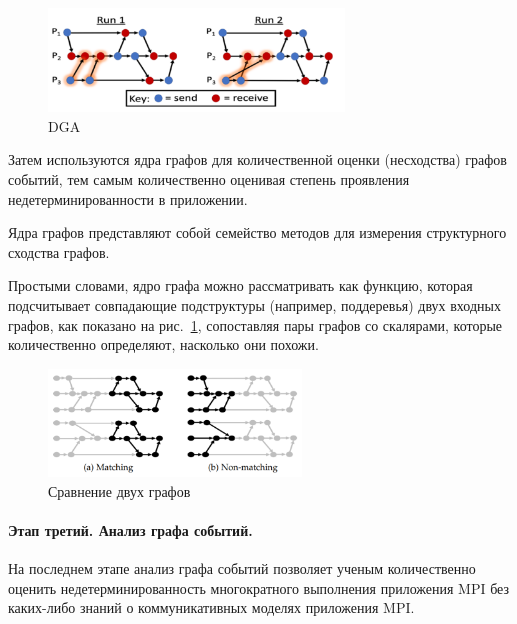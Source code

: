 \begin{figure}[h]
	\centering
	\includegraphics[width=0.7\textwidth]{ResearchNotes/rndhpc_not_edt_2021_11_10/krekhtunova/dga.png}
	\caption{DGA} 
\end{figure}

Затем используются ядра графов для количественной оценки (несходства) графов событий, тем самым количественно оценивая степень проявления недетерминированности в приложении.

Ядра графов представляют собой семейство методов для измерения структурного сходства графов. 

Простыми словами, ядро графа можно рассматривать как функцию, которая подсчитывает совпадающие подструктуры (например, поддеревья) двух входных графов, как показано на рис.~\ref{lab.rndhpc2021.11.10.010}, сопоставляя пары графов со скалярами, которые количественно определяют, насколько они похожи.

\begin{figure}[h]
	\centering
	\includegraphics[width=0.6\textwidth]{ResearchNotes/rndhpc_not_edt_2021_11_10/krekhtunova/graph_comp.png}
	\caption{Сравнение двух графов}\label{lab.rndhpc2021.11.10.010}
\end{figure}

\paragraph{Этап третий. Анализ графа событий.} На последнем этапе анализ графа событий позволяет ученым количественно оценить недетерминированность многократного выполнения приложения MPI без каких-либо знаний о коммуникативных моделях приложения MPI.

\noteattributes{}

